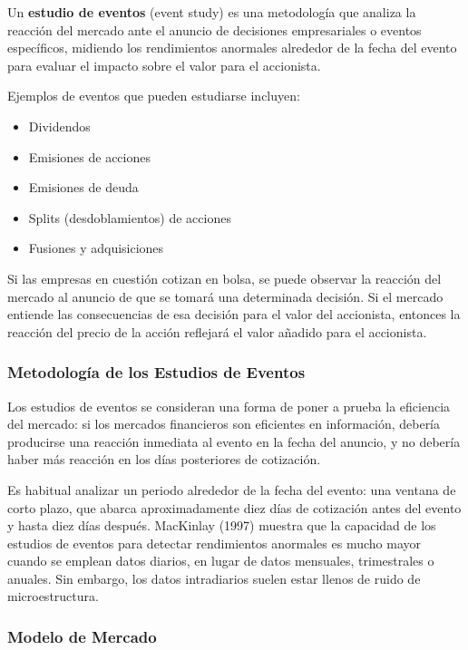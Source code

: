 \begin{definicion}
Un \textbf{estudio de eventos} (event study) es una metodología que analiza la reacción del mercado ante el anuncio de decisiones empresariales o eventos específicos, midiendo los rendimientos anormales alrededor de la fecha del evento para evaluar el impacto sobre el valor para el accionista.
\end{definicion}

Ejemplos de eventos que pueden estudiarse incluyen:
\begin{itemize}
\item Dividendos
\item Emisiones de acciones
\item Emisiones de deuda
\item Splits (desdoblamientos) de acciones
\item Fusiones y adquisiciones
\end{itemize}

Si las empresas en cuestión cotizan en bolsa, se puede observar la reacción del mercado al anuncio de que se tomará una determinada decisión. Si el mercado entiende las consecuencias de esa decisión para el valor del accionista, entonces la reacción del precio de la acción reflejará el valor añadido para el accionista.

\subsubsection{Metodología de los Estudios de Eventos}

Los estudios de eventos se consideran una forma de poner a prueba la eficiencia del mercado: si los mercados financieros son eficientes en información, debería producirse una reacción inmediata al evento en la fecha del anuncio, y no debería haber más reacción en los días posteriores de cotización.

Es habitual analizar un periodo alrededor de la fecha del evento: una ventana de corto plazo, que abarca aproximadamente diez días de cotización antes del evento y hasta diez días después. MacKinlay (1997) muestra que la capacidad de los estudios de eventos para detectar rendimientos anormales es mucho mayor cuando se emplean datos diarios, en lugar de datos mensuales, trimestrales o anuales. Sin embargo, los datos intradiarios suelen estar llenos de ruido de microestructura.

\subsubsection{Modelo de Mercado}

